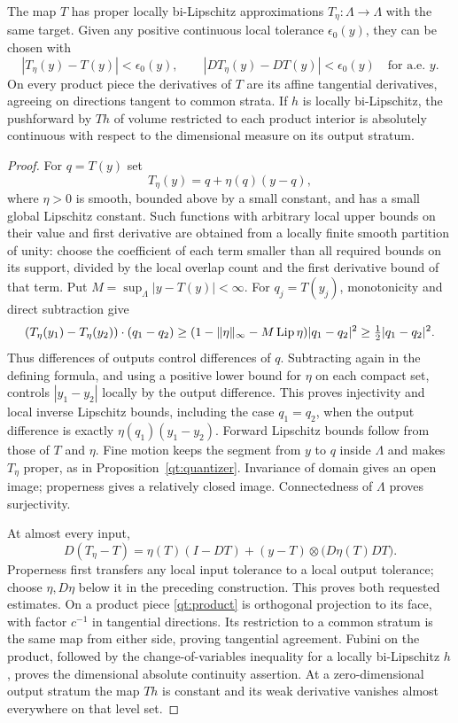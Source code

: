 \begin{lemma}\label{qt:strict}
The map $T$ has proper locally bi-Lipschitz approximations
$T_\eta:\Lambda\to\Lambda$ with the same target.  Given any positive
continuous local tolerance $\epsilon_0(y)$, they can be chosen with
\[
 |T_\eta(y)-T(y)|<\epsilon_0(y),\qquad
 |DT_\eta(y)-DT(y)|<\epsilon_0(y)\quad\text{for a.e. }y.
\]
On every product piece the derivatives of $T$ are its affine
tangential derivatives, agreeing on directions tangent to common
strata.  If $h$ is locally bi-Lipschitz, the pushforward by $Th$ of
volume restricted to each product interior is absolutely continuous
with respect to the dimensional measure on its output stratum.
\end{lemma}

\begin{proof}
For $q=T(y)$ set
\[
 T_\eta(y)=q+\eta(q)(y-q),
\]
where $\eta>0$ is smooth, bounded above by a small constant, and has a
small global Lipschitz constant.  Such functions with arbitrary local
upper bounds on their value and first derivative are obtained from a
locally finite smooth partition of unity: choose the coefficient of
each term smaller than all required bounds on its support, divided by
the local overlap count and the first derivative bound of that term.
Put $M=\sup_{\Lambda}|y-T(y)|<\infty$.  For $q_j=T(y_j)$,
monotonicity and direct subtraction give
\[
 (T_\eta(y_1)-T_\eta(y_2))\cdot(q_1-q_2)
 \geq(1-\|\eta\|_\infty-M\operatorname{Lip}\eta)|q_1-q_2|^2
 \geq\tfrac12|q_1-q_2|^2.
\]
Thus differences of outputs control differences of $q$.  Subtracting
again in the defining formula, and using a positive lower bound for
$\eta$ on each compact set, controls $|y_1-y_2|$ locally by the output
difference.  This proves injectivity and local inverse Lipschitz
bounds, including the case $q_1=q_2$, when the output difference is
exactly $\eta(q_1)(y_1-y_2)$.  Forward Lipschitz bounds follow from those
of $T$ and $\eta$.  Fine motion keeps the segment from $y$ to $q$
inside $\Lambda$ and makes $T_\eta$ proper, as in
Proposition~\ref{qt:quantizer}.  Invariance of domain gives an open
image; properness gives a relatively closed image.  Connectedness of
$\Lambda$ proves surjectivity.

At almost every input,
\[
 D(T_\eta-T)=\eta(T)(I-DT)
 +(y-T)\otimes\bigl(D\eta(T)DT\bigr).
\]
Properness first transfers any local input tolerance to a local output
tolerance; choose $\eta,D\eta$ below it in the preceding construction.
This proves both requested estimates.  On a product piece
\eqref{qt:product} is orthogonal projection to its face, with factor
$c^{-1}$ in tangential directions.  Its restriction to a common stratum
is the same map from either side, proving tangential agreement.
Fubini on the product, followed by the change-of-variables inequality
for a locally bi-Lipschitz $h$, proves the dimensional absolute
continuity assertion.  At a zero-dimensional output stratum the map
$Th$ is constant and its weak derivative vanishes almost everywhere
on that level set.
\end{proof}

